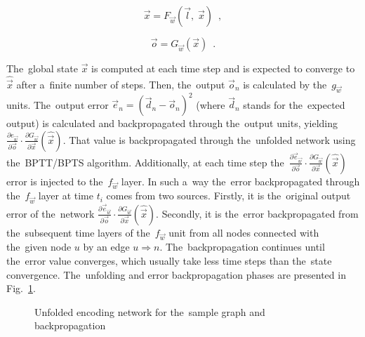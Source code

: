 \documentclass{llncs}
\begin{document}
\begin{equation}
\vec{x} = F_{\vec{w}}(\vec{l}, \; \vec{x}) \enspace ,
\label{eq:gnn_fglobal}
\end{equation}

\begin{equation}
\vec{o} = G_{\vec{w}}(\vec{x}) \enspace .
\label{eq:gnn_gglobal}
\end{equation}

\noindent The~global state $\vec{x}$ is computed at each time step and is expected to converge to $\hat{\vec{x}}$ after a~finite number of steps. Then, the~output $\vec{o}_n$ is calculated by the~$g_{\vec{w}}$ units. The~output error $\vec{e}_n = (\vec{d}_n - \vec{o}_n)^2$ (where $\vec{d}_n$ stands for the~expected output) is calculated and backpropagated through the~output units, yielding $\frac{\partial e_{\vec{w}}}{\partial \vec{o}}\cdot \frac{\partial G_{\vec{w}}}{\partial \vec{x}}(\hat{\vec{x}})$. That value is backpropagated through the~unfolded network using the~BPTT/BPTS algorithm. Additionally, at each time step the~$\frac{\partial \vec{e}_{\vec{w}}}{\partial \vec{o}}\cdot \frac{\partial G_{\vec{w}}}{\partial \vec{x}}(\hat{\vec{x}})$ error is injected to the~$f_{\vec{w}}$ layer. In such a~way the~error backpropagated through the~$f_{\vec{w}}$ layer at time $t_i$ comes from two sources. Firstly, it is the~original output error of the~network $\frac{\partial \vec{e}_{\vec{w}}}{\partial \vec{o}}\cdot \frac{\partial G_{\vec{w}}}{\partial \vec{x}}(\hat{\vec{x}})$. Secondly, it is the~error backpropagated from the~subsequent time layers of the~$f_{\vec{w}}$ unit from all nodes connected with the~given node $u$ by an edge $u \Rightarrow n$. The~backpropagation continues until the~error value converges, which usually take less time steps than the~state convergence. The~unfolding and error backpropagation phases are presented in Fig.~\ref{fig:gnn_forback}.

\begin{figure}[h!]
\begin{center}
	\caption[]{Unfolded encoding network for the~sample graph and backpropagation}
	\label{fig:gnn_forback}
\end{center}
\end{figure}
\end{document}
